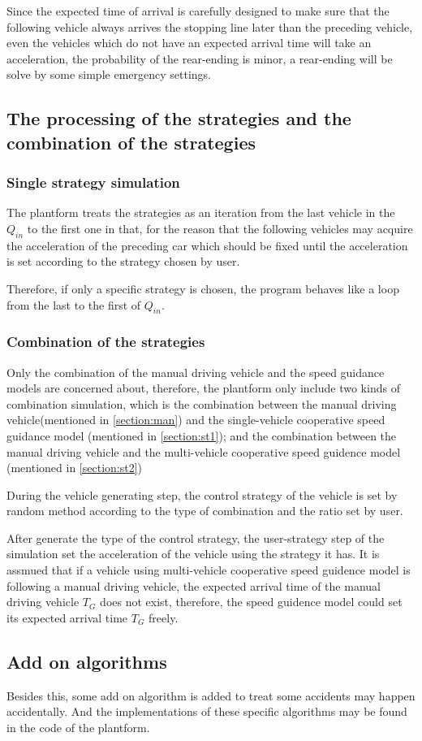 \documentclass[a4paper]{paper}
\begin{document}
Since the expected time of arrival is carefully designed to make sure that the following vehicle always arrives the stopping line later than the preceding vehicle, even the vehicles which do not have an expected arrival time will take an acceleration, the probability of the rear-ending is minor, a rear-ending will be solve by some simple emergency settings. 
\subsection{The processing of the strategies and the combination of the strategies}
\subsubsection{Single strategy simulation}
The plantform treats the strategies as an iteration from the last vehicle in the $Q_{in}$ to the first one in that, for the reason that the following vehicles may acquire the acceleration of the preceding car which should be fixed until the acceleration is set according to the strategy chosen by user. 

Therefore, if only a specific strategy is chosen, the program behaves like a loop from the last to the first of $Q_{in}$.

\subsubsection{Combination of the strategies}
Only the combination of the manual driving vehicle and the speed guidance models are concerned about, therefore, the plantform only include two kinds of combination simulation, which is the combination between the manual driving vehicle(mentioned in \ref{section:man}) and the single-vehicle cooperative speed guidance model (mentioned in \ref{section:st1}); and the combination between the manual driving vehicle and the multi-vehicle cooperative speed guidence model (mentioned in \ref{section:st2})

During the vehicle generating step, the control strategy of the vehicle is set by random method according to the type of combination and the ratio set by user.

After generate the type of the control strategy, the user-strategy step of the simulation set the acceleration of the vehicle using the strategy it has. It is assmued that if a vehicle using multi-vehicle cooperative speed guidence model is following a manual driving vehicle, the expected arrival time of the manual driving vehicle $T_G$ does not exist, therefore, the speed guidence model could set its expected arrival time $T_G$ freely.

\subsection{Add on algorithms}
Besides this, some add on algorithm is added to treat some accidents may happen accidentally. And the implementations of these specific algorithms may be found in the code of the plantform.
\end{document}
